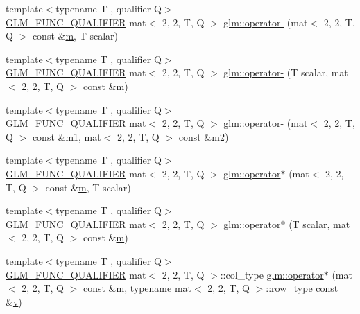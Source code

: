 \begin{DoxyCompactItemize}
\item 
{\footnotesize template$<$typename T , qualifier Q$>$ }\\\mbox{\hyperlink{setup_8hpp_a33fdea6f91c5f834105f7415e2a64407}{G\+L\+M\+\_\+\+F\+U\+N\+C\+\_\+\+Q\+U\+A\+L\+I\+F\+I\+ER}} mat$<$ 2, 2, T, Q $>$ \mbox{\hyperlink{namespaceglm_a1377fda325537bf0f563c7bd829416ff}{glm\+::operator-\/}} (mat$<$ 2, 2, T, Q $>$ const \&\mbox{\hyperlink{_s_d_l__opengl__glext_8h_af593500c283bf1a787a6f947f503a5c2}{m}}, T scalar)
\item 
{\footnotesize template$<$typename T , qualifier Q$>$ }\\\mbox{\hyperlink{setup_8hpp_a33fdea6f91c5f834105f7415e2a64407}{G\+L\+M\+\_\+\+F\+U\+N\+C\+\_\+\+Q\+U\+A\+L\+I\+F\+I\+ER}} mat$<$ 2, 2, T, Q $>$ \mbox{\hyperlink{namespaceglm_ab1508d8f7697189f83fa786e66533ccc}{glm\+::operator-\/}} (T scalar, mat$<$ 2, 2, T, Q $>$ const \&\mbox{\hyperlink{_s_d_l__opengl__glext_8h_af593500c283bf1a787a6f947f503a5c2}{m}})
\item 
{\footnotesize template$<$typename T , qualifier Q$>$ }\\\mbox{\hyperlink{setup_8hpp_a33fdea6f91c5f834105f7415e2a64407}{G\+L\+M\+\_\+\+F\+U\+N\+C\+\_\+\+Q\+U\+A\+L\+I\+F\+I\+ER}} mat$<$ 2, 2, T, Q $>$ \mbox{\hyperlink{namespaceglm_a201b559537ef9c60afcbc3b9907943e2}{glm\+::operator-\/}} (mat$<$ 2, 2, T, Q $>$ const \&m1, mat$<$ 2, 2, T, Q $>$ const \&m2)
\item 
{\footnotesize template$<$typename T , qualifier Q$>$ }\\\mbox{\hyperlink{setup_8hpp_a33fdea6f91c5f834105f7415e2a64407}{G\+L\+M\+\_\+\+F\+U\+N\+C\+\_\+\+Q\+U\+A\+L\+I\+F\+I\+ER}} mat$<$ 2, 2, T, Q $>$ \mbox{\hyperlink{namespaceglm_a10927c695f87f4e9a4c9b6493980b842}{glm\+::operator$\ast$}} (mat$<$ 2, 2, T, Q $>$ const \&\mbox{\hyperlink{_s_d_l__opengl__glext_8h_af593500c283bf1a787a6f947f503a5c2}{m}}, T scalar)
\item 
{\footnotesize template$<$typename T , qualifier Q$>$ }\\\mbox{\hyperlink{setup_8hpp_a33fdea6f91c5f834105f7415e2a64407}{G\+L\+M\+\_\+\+F\+U\+N\+C\+\_\+\+Q\+U\+A\+L\+I\+F\+I\+ER}} mat$<$ 2, 2, T, Q $>$ \mbox{\hyperlink{namespaceglm_aed9324ded8d99d04c11469336712e453}{glm\+::operator$\ast$}} (T scalar, mat$<$ 2, 2, T, Q $>$ const \&\mbox{\hyperlink{_s_d_l__opengl__glext_8h_af593500c283bf1a787a6f947f503a5c2}{m}})
\item 
{\footnotesize template$<$typename T , qualifier Q$>$ }\\\mbox{\hyperlink{setup_8hpp_a33fdea6f91c5f834105f7415e2a64407}{G\+L\+M\+\_\+\+F\+U\+N\+C\+\_\+\+Q\+U\+A\+L\+I\+F\+I\+ER}} mat$<$ 2, 2, T, Q $>$\+::col\+\_\+type \mbox{\hyperlink{namespaceglm_a3cd60e902ab9b6dbef3d0fa73d3277e1}{glm\+::operator$\ast$}} (mat$<$ 2, 2, T, Q $>$ const \&\mbox{\hyperlink{_s_d_l__opengl__glext_8h_af593500c283bf1a787a6f947f503a5c2}{m}}, typename mat$<$ 2, 2, T, Q $>$\+::row\+\_\+type const \&\mbox{\hyperlink{_s_d_l__opengl_8h_a10a82eabcb59d2fcd74acee063775f90}{v}})

\end{DoxyCompactItemize}
